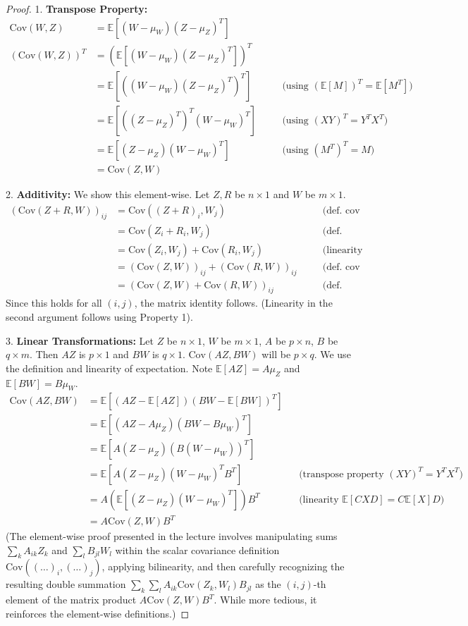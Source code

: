 \documentclass[11pt]{article}
\theoremstyle{definition}
\newcommand{\E}{\mathbb{E}}
\newcommand{\Cov}{\mathrm{Cov}}
\begin{document}
\begin{proof}
1.  \textbf{Transpose Property:}
    \begin{align*}
    \Cov(W, Z) &= \E[ (W - \mu_W) (Z - \mu_Z)^T ] \\
    (\Cov(W, Z))^T &= (\E[ (W - \mu_W) (Z - \mu_Z)^T ])^T \\
    &= \E[ ((W - \mu_W) (Z - \mu_Z)^T)^T ] \quad &&\text{(using } (\E[M])^T = \E[M^T]) \\
    &= \E[ ( (Z - \mu_Z)^T )^T (W - \mu_W)^T ] \quad &&\text{(using } (XY)^T = Y^T X^T) \\
    &= \E[ (Z - \mu_Z) (W - \mu_W)^T ] \quad &&\text{(using } (M^T)^T = M) \\
    &= \Cov(Z, W)
    \end{align*}

2.  \textbf{Additivity:} We show this element-wise. Let $Z, R$ be $n \times 1$ and $W$ be $m \times 1$.
    \begin{align*}
    (\Cov(Z+R, W))_{ij} &= \Cov( (Z+R)_i, W_j ) \quad &&\text{(def. cov matrix element)} \\
    &= \Cov( Z_i + R_i, W_j ) \quad &&\text{(def. vector addition)} \\
    &= \Cov( Z_i, W_j ) + \Cov( R_i, W_j ) \quad &&\text{(linearity of scalar cov)} \\
    &= (\Cov(Z, W))_{ij} + (\Cov(R, W))_{ij} \quad &&\text{(def. cov matrix element)} \\
    &= (\Cov(Z, W) + \Cov(R, W))_{ij} \quad &&\text{(def. matrix addition)}
    \end{align*}
    Since this holds for all $(i,j)$, the matrix identity follows. (Linearity in the second argument follows using Property 1).

3.  \textbf{Linear Transformations:} Let $Z$ be $n \times 1$, $W$ be $m \times 1$, $A$ be $p \times n$, $B$ be $q \times m$. Then $AZ$ is $p \times 1$ and $BW$ is $q \times 1$. $\Cov(AZ, BW)$ will be $p \times q$.
    We use the definition and linearity of expectation. Note $\E[AZ] = A\mu_Z$ and $\E[BW] = B\mu_W$.
    \begin{align*}
    \Cov(AZ, BW) &= \E[ (AZ - \E[AZ]) (BW - \E[BW])^T ] \\
    &= \E[ (AZ - A\mu_Z) (BW - B\mu_W)^T ] \\
    &= \E[ A(Z - \mu_Z) (B(W - \mu_W))^T ] \\
    &= \E[ A(Z - \mu_Z) (W - \mu_W)^T B^T ] \quad &&\text{(transpose property }(XY)^T = Y^T X^T) \\
    &= A \left( \E[ (Z - \mu_Z) (W - \mu_W)^T ] \right) B^T \quad &&\text{(linearity } \E[CXD]=C\E[X]D) \\
    &= A \Cov(Z, W) B^T
    \end{align*}
    (The element-wise proof presented in the lecture involves manipulating sums $\sum_k A_{ik} Z_k$ and $\sum_l B_{jl} W_l$ within the scalar covariance definition $\Cov((\dots)_i, (\dots)_j)$, applying bilinearity, and then carefully recognizing the resulting double summation $\sum_k \sum_l A_{ik} \Cov(Z_k, W_l) B_{jl}$ as the $(i,j)$-th element of the matrix product $A \Cov(Z, W) B^T$. While more tedious, it reinforces the element-wise definitions.)


\end{proof}
\end{document}
